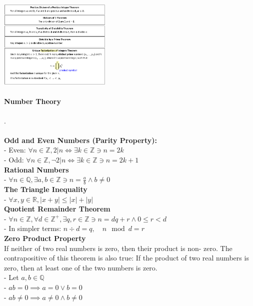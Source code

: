 \documentclass[10pt,letterpaper]{article}
\begin{document}
\begin{multicols}{2}

\begin{center}
\includegraphics[width=0.4\textwidth]{divisibility-theorems.png}
\end{center}

\paragraph*{Number Theory}.\\\\
\textbf{Odd and Even Numbers (Parity Property):}\\
- Even: $\forall n \in \mathbb{Z}, 2|n \iff \exists k \in \mathbb{Z} \ni n = 2k$\\
- Odd: $\forall n \in \mathbb{Z}, \neg{2|n} \iff \exists k \in \mathbb{Z} \ni n = 2k + 1$\\
\textbf{Rational Numbers}\\
- $\forall n \in \mathbb{Q}, \exists a,b \in \mathbb{Z} \ni n = \frac{a}{b} \land b \neq 0$\\
\textbf{The Triangle Inequality}\\
- $\forall x,y \in \mathbb{R}, |x+y| \leq |x| + |y|$\\
\textbf{Quotient Remainder Theorem}\\
- $\forall n \in \mathbb{Z}, \forall d \in \mathbb{Z}^+, \exists q, r \in \mathbb{Z} \ni n = dq + r \land 0 \leq r < d$\\
- In simpler terms: $n \div d = q, \quad n \mod d = r$\\
\textbf{Zero Product Property}\\
If neither of two real numbers is zero, then their product is non-
zero. The contrapositive of this theorem is also true: If the product of two
real numbers is zero, then at least one of the two numbers is zero.\\
- Let $a,b \in \mathbb{Q}$\\
- $ab = 0 \implies a = 0 \lor b = 0$\\
- $ab \neq 0 \implies a \neq 0 \land b \neq 0$\\



\end{multicols}
\end{document}

